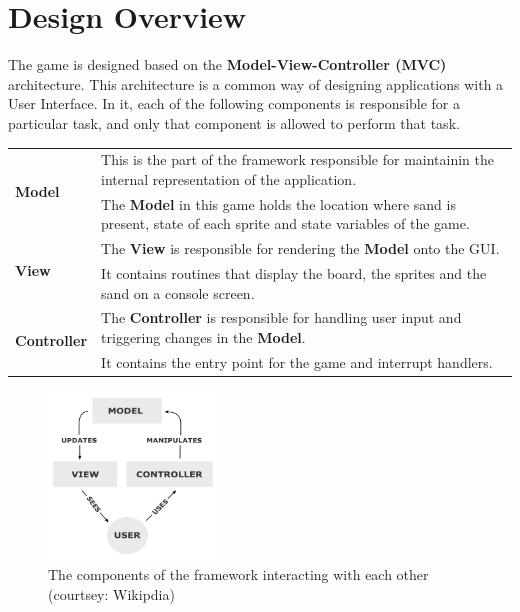 \section{Design Overview}

The game is designed based on the \textbf{Model-View-Controller (MVC)} architecture.
This architecture is a common way of designing applications with a User Interface.
In it, each of the following components is responsible for a particular task, and only that component is allowed to perform that task.

\begin{table}[H]
  \centering
  \bgroup
  \def\arraystretch{1.5}
  \begin{tabularx}{\textwidth}{|p{3cm}|X|}

    \hline
    \multirow{2}{*}{\textbf{Model}}  
      & This is the part of the framework responsible for maintainin the internal representation of the application.                            \\
      & The \textbf{Model} in this game holds the location where sand is present, state of each sprite and state variables of the game.         \\
    \hline

    \multirow{2}{*}{\textbf{View}}   
      & The \textbf{View} is responsible for rendering the \textbf{Model} onto the GUI.                                                         \\
      & It contains routines that display the board, the sprites and the sand on a console screen.                                              \\
    \hline

    \multirow{2}{*}{\textbf{Controller}} 
      & The \textbf{Controller} is responsible for handling user input and triggering changes in the \textbf{Model}.                            \\
      & It contains the entry point for the game and interrupt handlers.                                                                        \\
    \hline

  \end{tabularx}
  \egroup
\end{table}


\begin{figure}[H]
  \centering
  \includegraphics[width=0.4\textwidth]{images/mvc-process.png}
  \caption{\label{fig:mvc-process} The components of the framework interacting with each other (courtsey: Wikipdia)}
\end{figure}

\newpage

\newpage

\newpage



